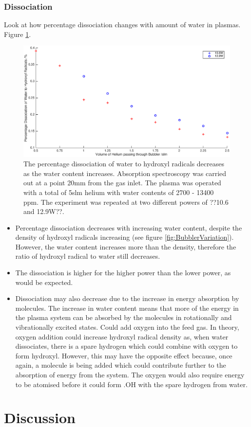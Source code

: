 \documentclass[11pt, oneside]{article}   	%
\begin{document}
\subsubsection{Dissociation}

Look at how percentage dissociation changes with amount of water in plasmas. Figure \ref{fig:BubblerDissociation}.

\begin{figure}
    \centering
    \includegraphics[width=\textwidth]{Figures/BubblerDissociation.eps}
    \caption{The percentage dissociation of water to hydroxyl radicals decreases as the water content increases. Absorption spectroscopy was carried out at a point 20mm from the gas inlet. The plasma was operated with a total of 5slm helium with water contents of 2700 - 13400 ppm. The experiment was repeated at two different powers of ??10.6 and 12.9W??.}
    \label{fig:BubblerDissociation}
\end{figure}

\begin{itemize}
    \item Percentage dissociation decreases with increasing water content, despite the density of hydroxyl radicals increasing (see figure \ref{fig:BubblerVariation}). However, the water content increases more than the density, therefore the ratio of hydroxyl radical to water still decreases.
    \item The dissociation is higher for the higher power than the lower power, as would be expected. 
    \item Dissociation may also decrease due to the increase in energy absorption by molecules. The increase in water content means that more of the energy in the plasma system can be absorbed by the molecules in rotationally and vibrationally excited states. Could add oxygen into the feed gas. In theory, oxygen addition could increase hydroxyl radical density as, when water dissociates, there is a spare hydrogen which could combine with oxygen to form hydroxyl. However, this may have the opposite effect because, once again, a molecule is being added which could contribute further to the absorption of energy from the system. The oxygen would also require energy to be atomised before it could form .OH with the spare hydrogen from water.
\end{itemize}




\section{Discussion}



\end{document}
